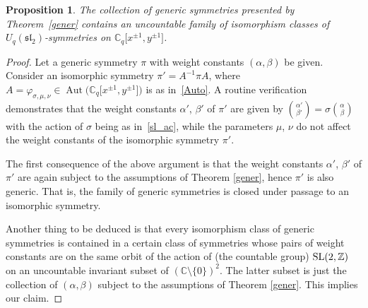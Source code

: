 \documentclass[10pt,a4paper]{amsart}
\numberwithin{equation}{section}
\newtheorem{Proposition}[Theorem]{Proposition}
 { \theoremstyle{definition}
\newtheorem{Definition}[Theorem]{Definition}
\newtheorem{Remark}[Theorem]{Remark} }
\begin{document}
\begin{Proposition}\label{ufnis} The collection of generic symmetries presented by Theorem~{\rm \ref{gener}} contains an uncountable family of isomorphism classes of $U_q(\mathfrak{sl}_2)$-symmetries on $\mathbb{C}_q\big[x^{\pm 1},y^{\pm 1}\big]$.
\end{Proposition}

\begin{proof} Let a generic symmetry $\pi$ with weight constants $(\alpha,\beta)$ be given. Consider an isomorphic symmetry $\pi'=A^{-1}\pi A$, where $A=\varphi_{\sigma,\mu,\nu}\in\operatorname{Aut}\big(\mathbb{C}_q\big[x^{\pm 1},y^{\pm 1}\big]\big)$ is as in~\eqref{Auto}. A routine verification demonstrates that the weight constants $\alpha'$, $\beta'$ of $\pi'$ are given by $\binom{\alpha'}{\beta'}=\sigma\binom{\alpha}{\beta}$ with the action of $\sigma$ being as in~\eqref{sl_ac}, while the parameters $\mu$, $\nu$ do not affect the weight constants of the isomorphic symmetry $\pi'$.

The first consequence of the above argument is that the weight constants $\alpha'$, $\beta'$ of $\pi'$ are again subject to the assumptions of Theorem \ref{gener}, hence $\pi'$ is also generic. That is, the family of generic symmetries is closed under passage to an isomorphic symmetry.

Another thing to be deduced is that every isomorphism class of generic symmetries is contained in a certain class of symmetries whose pairs of weight constants are on the same orbit of the action of (the countable group) ${\rm SL}(2,\mathbb{Z})$ on an uncountable invariant subset of $(\mathbb{C}{\setminus}\{0\})^2$. The latter subset is just the collection of $(\alpha,\beta)$ subject to the assumptions of Theorem \ref{gener}. This implies our claim.
\end{proof}
\end{document}
